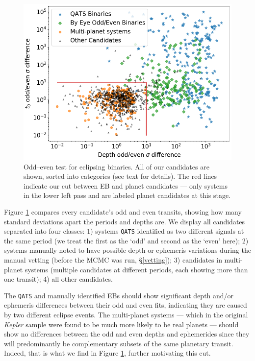 \documentclass[twocolumn]{aastex62}
\newcommand{\project}[1]{\textsl{#1}}
\newcommand{\pipeline}[1]{\texttt{#1}}
\begin{document}
\begin{figure}[tbp]
\includegraphics[width=\columnwidth]{binary_find.png}
\caption{Odd--even test for eclipsing binaries. All of our candidates
  are shown, sorted into categories (see text for details). The red
  lines indicate our cut between EB and planet candidates --- only
  systems in the lower left pass and are labeled planet candidates at
  this stage.  \label{binary_match}}
\end{figure}

Figure \ref{binary_match} compares every candidate's odd and even
transits, showing how many standard deviations apart the periods and
depths are. We display all candidates separated into four classes: 1)
systems \pipeline{QATS} identified as two different signals at the
same period (we treat the first as the `odd' and second as the `even'
here); 2) systems manually noted to have possible depth or ephemeris
variations during the manual vetting (before the MCMC was run,
\S\ref{vetting}); 3) candidates in multi-planet systems (multiple
candidates at different periods, each showing more than one transit);
4) all other candidates.

The \pipeline{QATS} and manually identified EBs should show
significant depth and/or ephemeris differences between their odd and
even fits, indicating they are caused by two different eclipse
events. The multi-planet systems --- which in the original
\project{Kepler} sample were found to be much more likely to be real
planets \citep{row14} --- should show no differences between the odd
and even depths and ephemerides since they will predominantly be
complementary subsets of the same planetary transit. Indeed, that is
what we find in Figure \ref{binary_match}, further motivating this
cut.
\end{document}

